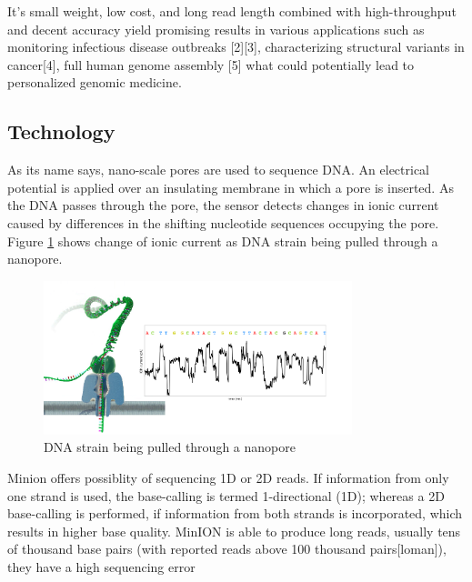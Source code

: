 \documentclass[times, utf8, diplomski, numeric, english]{fer}
\begin{document}
It’s small weight, low cost, and long read length combined with high-throughput and decent accuracy yield promising results in various applications such as monitoring infectious disease outbreaks [2][3], characterizing structural variants in cancer[4], full human genome assembly [5] what could potentially lead to personalized genomic medicine.



\subsection{Technology}
As its name says, nano-scale pores are used to sequence DNA. An electrical potential is applied over an insulating membrane in which a  pore is inserted. As the DNA passes through the pore, the sensor detects changes in ionic current caused by differences in the shifting nucleotide sequences occupying the pore. Figure \ref{fg:nanopore} shows change of ionic current as DNA strain being pulled through a nanopore.

\begin{figure}[!ht]
	\begin{center}
		\includegraphics[width=0.8\textwidth]{./imgs/nanopore.png}

		\caption[DNA strain being pulled through a nanopore]{DNA strain being pulled through a nanopore \protect\footnotemark}
		\label{fg:nanopore}
	\end{center}
\end{figure}

Minion offers possiblity of sequencing 1D or 2D reads. 
 If information from only one strand is used, the base-calling is termed 1-directional (1D); whereas a 2D base-calling is performed, if information from both strands is incorporated, which results in higher base quality.
 MinION is able to produce long reads, usually tens of thousand
 base pairs (with reported reads above 100 thousand pairs[loman]), they have a high sequencing error
 
\end{document}
